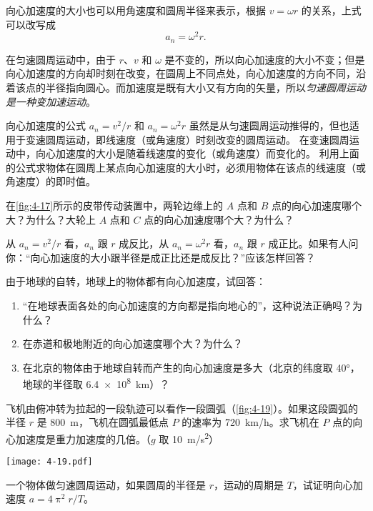 向心加速度的大小也可以用角速度和圆周半径来表示，根据 $v=\omega r$ 的关系，上式可以改写成
\[a_n=\omega^2 r.\]

在匀速圆周运动中，由于 $r$、$v$ 和 $\omega$ 是不变的，所以向心加速度的大小不变；但是向心加速度的方向却时刻在改变，在圆周上不同点处，向心加速度的方向不同，沿着该点的半径指向圆心。而加速度是既有大小又有方向的矢量，所以\emph{匀速圆周运动是一种变加速运动}。

向心加速度的公式 $a_n=v^2/r$ 和 $a_n=\omega^2 r$ 虽然是从匀速圆周运动推得的，但也适用于变速圆周运动，即线速度（或角速度）时刻改变的圆周运动。
在变速圆周运动中，向心加速度的大小是随着线速度的变化（或角速度）而变化的。
利用上面的公式求物体在圆周上某点向心加速度的大小时，必须用物体在该点的线速度（或角速度）的即时值。

\begin{Practice}
\begin{question}
	\item 在\cref{fig:4-17}所示的皮带传动装置中，两轮边缘上的 $A$ 点和 $B$ 点的向心加速度哪个大？为什么？大轮上 $A$ 点和 $C$ 点的向心加速度哪个大？为什么？
	\item 从 $a_n=v^2/r$ 看，$a_n$ 跟 $r$ 成反比，从 $a_n=\omega^2r$ 看，$a_n$ 跟 $r$ 成正比。如果有人问你：“向心加速度的大小跟半径是成正比还是成反比？”应该怎样回答？
	\item 由于地球的自转，地球上的物体都有向心加速度，试回答：
  \begin{enumerate}
    \item “在地球表面各处的向心加速度的方向都是指向地心的”，这种说法正确吗？为什么？
    \item 在赤道和极地附近的向心加速度哪个大？为什么？
    \item 在北京的物体由于地球自转而产生的向心加速度是多大（北京的纬度取 \ang{40}，地球的半径取 \qty{6.4e8}{km}）？	
  \end{enumerate}
  \item	 飞机由俯冲转为拉起的一段轨迹可以看作一段圆弧（\cref{fig:4-19}）。如果这段圆弧的半径 $r$ 是 \qty{800}{m}，飞机在圆弧最低点 $P$ 的速率为 \qty{720}{km/h}。求飞机在 $P$ 点的向心加速度是重力加速度的几倍。（$g$ 取 \qty{10}{m/s^2}）
  \begin{figurehere}
    \begin{minipage}{\linewidth}\centering
      \texttt{[image: 4-19.pdf]}
      \caption{}\label{fig:4-19}
    \end{minipage}
  \end{figurehere}
	\item 一个物体做匀速圆周运动，如果圆周的半径是 $r$，运动的周期是 $T$，试证明向心加速度 $a=4\uppi^2r/T$。
\end{question}
\end{Practice}

